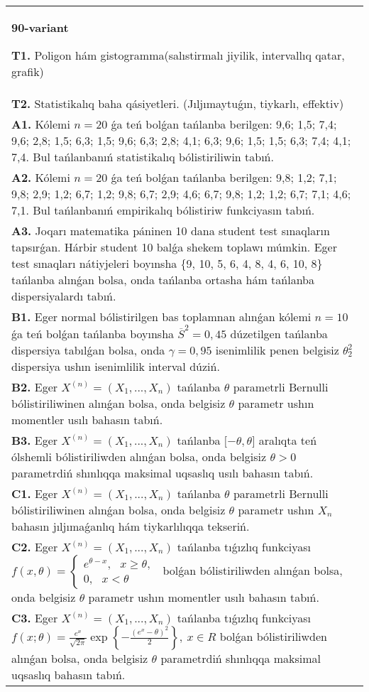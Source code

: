 \documentclass{article}
\begin{document}
\begin{tabular}{m{17cm}}
\textbf{90-variant}
\newline

\textbf{T1.} 
Poligon hám gistogramma(salıstirmalı jiyilik, intervallıq qatar, grafik)
 \\
\textbf{T2.} 
Statistikalıq baha qásiyetleri. (Jıljımaytuǵın, tiykarlı, effektiv)
 \\
\textbf{A1.} 
Kólemi \(n = 20\) ǵa teń bolǵan tańlanba berilgen: 9,6; 1,5; 7,4; 9,6; 2,8; 1,5; 6,3; 1,5; 9,6; 6,3; 2,8; 4,1; 6,3; 9,6; 1,5; 1,5; 6,3; 7,4; 4,1; 7,4. Bul tańlanbanıń statistikalıq bólistiriliwin tabıń.
 \\
\textbf{A2.} 
Kólemi \(n = 20\) ǵa teń bolǵan tańlanba berilgen: 9,8; 1,2; 7,1; 9,8; 2,9; 1,2; 6,7; 1,2; 9,8; 6,7; 2,9; 4,6; 6,7; 9,8; 1,2; 1,2; 6,7; 7,1; 4,6; 7,1. Bul tańlanbanıń empirikalıq bólistiriw funkciyasın tabıń.
 \\
\textbf{A3.} 
Joqarı matematika páninen 10 dana student test sınaqların tapsırǵan. Hárbir student 10 balǵa shekem toplawı múmkin. Eger test sınaqları nátiyjeleri boyınsha \{9, 10, 5, 6, 4, 8, 4, 6, 10, 8\} tańlanba alınǵan bolsa, onda tańlanba ortasha hám tańlanba dispersiyalardı tabıń.
 \\
\textbf{B1.} 
Eger normal bólistirilgen bas toplamnan alınǵan kólemi \(n = 10\) ǵa teń bolǵan tańlanba boyınsha \({\overline{S}}^{2} = 0,45\) dúzetilgen tańlanba dispersiya tabılǵan bolsa, onda \(\gamma = 0,95\) isenimlilik penen belgisiz \(\theta_{2}^{2}\) dispersiya ushın isenimlilik interval dúziń.
 \\
\textbf{B2.} 
Eger \(X^{(n)} = \left( X_{1},...,X_{n} \right)\) tańlanba \(\theta\) parametrli Bernulli bólistiriliwinen alınǵan bolsa, onda belgisiz \(\theta\) parametr ushın momentler usılı bahasın tabıń.
 \\
\textbf{B3.} 
Eger \(X^{(n)} = \left( X_{1},...,X_{n} \right)\) tańlanba \(\lbrack - \theta,\theta\rbrack\) aralıqta teń ólshemli bólistiriliwden alınǵan bolsa, onda belgisiz \(\theta > 0\) parametrdiń shınlıqqa maksimal uqsaslıq usılı bahasın tabıń.
 \\
\textbf{C1.} 
Eger \(X^{(n)} = \left( X_{1},...,X_{n} \right)\) tańlanba \(\theta\) parametrli Bernulli bólistiriliwinen alınǵan bolsa, onda belgisiz \(\theta\) parametr ushın \(X_{n}\) bahasın jıljımaǵanlıq hám tiykarlılıqqa tekseriń.
 \\
\textbf{C2.} 
Eger \(X^{(n)} = \left( X_{1},...,X_{n} \right)\) tańlanba tıǵızlıq funkciyası
$
{f(x,\theta) = \left\{ \begin{array}{r}
e^{\theta - x},\ \ \ x \geq \theta, \\
0,\ \ \ x < \theta
\end{array} \right.\ }$
bolǵan bólistiriliwden alınǵan bolsa, onda belgisiz \(\theta\) parametr ushın momentler usılı bahasın tabıń.
 \\
\textbf{C3.} 
Eger \(X^{(n)} = \left( X_{1},...,X_{n} \right)\) tańlanba tıǵızlıq funkciyası
$f(x;\theta) = \frac{e^{x}}{\sqrt{2\pi}}\exp\left\{ - \frac{\left( e^{x} - \theta \right)^{2}}{2} \right\},\ x \in R$
bolǵan bólistiriliwden alınǵan bolsa, onda belgisiz \(\theta\) parametrdiń shınlıqqa maksimal uqsaslıq bahasın tabıń.
 \\


\end{tabular}
\end{document}
